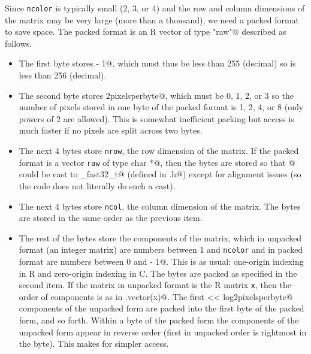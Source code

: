 \documentclass[11pt]{article}
\begin{document}
Since \texttt{ncolor}
is typically small (2, 3, or 4) and the row and column dimensions of the
matrix may be very large (more than a thousand), we need a packed format to
save space.  The packed format is an R vector of type \verb@"raw"@ described
as follows.
\begin{itemize}
\item The first byte stores \verb@ncolor - 1@, which must thus be less than
255 (decimal) so \verb@ncolor@ is less than 256 (decimal).
\item The second byte stores \verb@log2pixelsperbyte@,
which must be 0, 1, 2, or 3 so the number of pixels stored in one byte
of the packed format is 1, 2, 4, or 8 (only powers of 2 are allowed).
This is somewhat inefficient packing but access is much faster if no
pixels are split across two bytes.
\item The next 4 bytes store \texttt{nrow}, the row dimension of the matrix.
If the
packed format is a vector \texttt{raw} of type \verb@unsigned char *@,
then the bytes are stored so that \verb@raw[2]@ could be cast
to \verb@uint_fast32_t@ (defined in \verb@stdint.h@) except for alignment
issues (so the code does not literally do such a cast).
\item The next 4 bytes store \texttt{ncol}, the column dimension of the matrix.
The bytes are stored in the same order as the previous item.
\item The rest of the bytes store the components of the matrix, which in
unpacked format (an integer matrix) are numbers between 1 and \texttt{ncolor}
and in packed format are numbers between 0 and \verb@ncolor - 1@.  This is
as usual: one-origin indexing in R and zero-origin indexing in C.
The bytes are packed as specified in the second item.  If the matrix
in unpacked format is the R matrix \texttt{x}, then the order of components
is as in \verb@as.vector(x)@.  The first  << log2pixelsperbyte@
components of the unpacked form are packed into the first byte of the packed
form, and so forth.  Within a byte of the packed form the components of
the unpacked form appear in reverse order (first in unpacked order is
rightmost in the byte).  This makes for simpler access.
\end{itemize}
\end{document}
